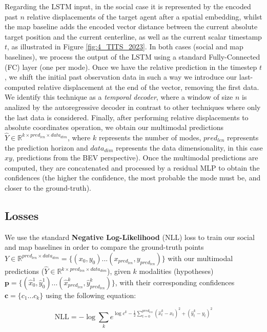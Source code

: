 Regarding the LSTM input, in the social case it is represented by the encoded past $n$ relative displacements of the target agent after a spatial embedding, whilst the map baseline adds the encoded vector distance between the current absolute target position and the current centerline, as well as the current scalar timestamp $t$, as illustrated in Figure \ref{fig:4_TITS_2023}. In both cases (social and map baselines), we process the output of the LSTM using a standard Fully-Connected (FC) layer (one per mode). Once we have the relative prediction in the timestep $t$, we shift the initial past observation data in such a way we introduce our last-computed relative displacement at the end of the vector, removing the first data. We identify this technique as a \textit{temporal decoder}, where a window of size $n$ is analized by the autoregressive decoder in contrast to other techniques \cite{dendorfer2020goal, sadeghian2019sophie, gupta2018social} where only the last data is considered. Finally, after performing relative displacements to absolute coordinates operation, we obtain our multimodal predictions $\hat{Y} \in \mathbb{R}^{k \times pred_{len} \times data_{dim}}$, where $k$ represents the number of modes, $pred_{len}$ represents the prediction horizon and $data_{dim}$ represents the data dimensionality, in this case $xy$, predictions from the BEV perspective). Once the multimodal predictions are computed, they are concatenated and processed by a residual MLP to obtain the confidences (the higher the confidence, the most probable the mode must be, and closer to the ground-truth).

\subsection{Losses}
\label{subsubsec:4_efficient_baselines_losses}

We use the standard \textbf{Negative Log-Likelihood} (NLL) loss to train our social and map baselines in order to compare the ground-truth points $Y \in \mathbb{R}^{pred_{len} \times data_{dim}} = \{(x_0,y_0) ... (x_{pred_{len}}, y_{pred_{len}})\}$ with our multimodal predictions ($\hat{Y} \in \mathbb{R}^{k \times pred_{len} \times data_{dim}}$), given $k$ modalities (hypotheses) $\mathbf{p}=\{(\hat{x}^1_0,\hat{y}^1_0) ... (\hat{x}^k_{pred_{len}}, \hat{y}^k_{pred_{len}})\}$, with their corresponding confidences $\mathbf{c}=\{c_1 ... c_k\}$ using the following equation:

\begin{equation}
	\text{NLL} = -\log \sum_{k} e^{ \log{c^k} - \frac{1}{2} \sum_{t=0}^{pred_{len}} (\hat{x}^k_t - x_t)^2 + (\hat{y}^k_t - y_t )^2 }
	\label{eq:nll}
\end{equation}

